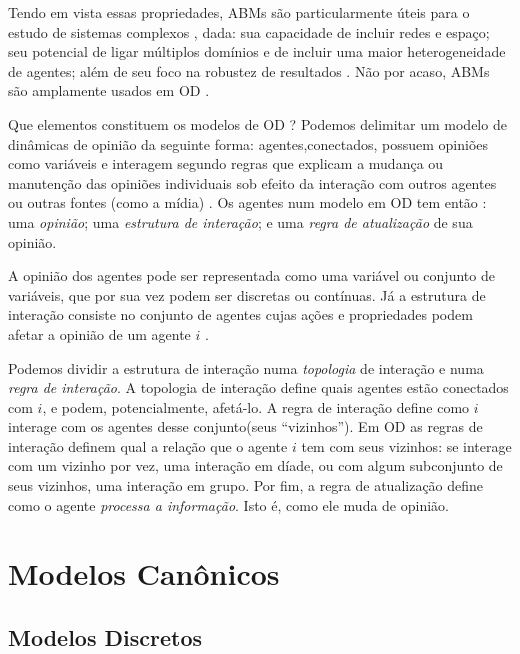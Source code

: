   Tendo em vista essas propriedades, ABMs são particularmente úteis para o
  estudo de sistemas complexos \cite{wilensky2015introduction}, dada: sua
  capacidade de incluir redes e espaço; seu potencial de ligar múltiplos
  domínios e de incluir uma maior heterogeneidade de agentes; além de seu foco
  na robustez de resultados \cite{de2014agent,wilensky2015introduction}. Não por
  acaso, ABMs são amplamente usados em OD  \cite{castellano2012social,flache2017}.

  Que elementos constituem os modelos de OD ? Podemos delimitar um modelo de
  dinâmicas de opinião da seguinte forma: agentes,conectados, possuem opiniões
  como variáveis e interagem segundo regras que explicam a mudança ou manutenção
  das opiniões individuais sob efeito da interação com outros agentes ou outras
  fontes (como a mídia) \cite{sirbu2017opinion}. Os agentes num modelo em OD tem
  então : uma \textit{opinião}; uma \textit{estrutura de interação}; e uma
  \textit{regra de atualização} de sua opinião.


  A opinião dos agentes pode ser representada como uma variável ou conjunto de
  variáveis, que por sua vez podem ser discretas ou contínuas. Já a estrutura de
  interação consiste no conjunto de agentes cujas ações e propriedades podem
  afetar a opinião de um agente \(i\) \cite{page2008uncertainty}.

  Podemos dividir a estrutura de interação numa \textit{topologia} de interação e
  numa \textit{regra de interação}. A topologia de interação define quais
  agentes estão conectados com \(i\), e podem, potencialmente, afetá-lo. A regra
  de interação define como \(i\) interage com os agentes desse conjunto(seus
  ``vizinhos''). Em OD as regras de interação definem qual a
  relação que o agente \(i\) tem com seus vizinhos: se interage com um vizinho
  por vez, uma interação em díade, ou com algum subconjunto de seus vizinhos,
  uma interação em grupo. Por fim, a regra de atualização define como o agente
  \textit{processa a informação}. Isto é, como ele muda de opinião.

  

  \section{Modelos Canônicos}
  
\subsection{Modelos Discretos}

